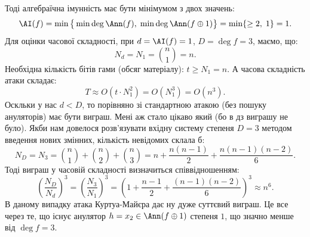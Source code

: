 Тоді алгебраїчна імунність має бути мінімумом з двох значень:
\begin{equation*}
    \AI(f) = \min\big\{\min \deg \Ann(f),\; \min \deg \Ann(f \oplus 1)\big\} = \min\{\geq 2,\; 1\} = 1.
\end{equation*}
Для оцінки часової складності, при $d = \AI(f) = 1$, $D = \deg f = 3$, маємо, що:
\begin{equation*}
    N_{d} = N_{1} = \binom{n}{1} = n.
\end{equation*}
Необхідна кількість бітів гами (обсяг матеріалу): $t \geq N_1 = n$. А часова складність атаки складає:
\begin{equation*}
    T \approx O\!\left(t \cdot N_1^2\right) = O\!\left(N_1^3\right) = O(n^3).
\end{equation*}
Оскльки у нас $d < D$, то порівняно зі стандартною атакою (без пошуку ануляторів) має бути виграш. Мені аж стало 
цікаво який (бо в дз виграшу не було). Якби нам довелося розв'язувати вхідну систему степеня $D = 3$ методом 
введення нових змінних, кількість невідомих склала б:
\begin{equation*}
    N_D = N_3 = \binom{n}{1} + \binom{n}{2} + \binom{n}{3}
    = n + \frac{n(n-1)}{2} + \frac{n(n-1)(n-2)}{6}.
\end{equation*}
Тоді виграш у часовій складності визначиться співвідношенням:
\begin{equation*}
    \left(\frac{N_D}{N_d}\right)^{\!3} = \left(\frac{N_3}{N_1}\right)^{\!3}
    = \left(1 + \frac{n-1}{2} + \frac{(n-1)(n-2)}{6}\right)^{\!3} \approx n^{6}.
\end{equation*}
В даному випадку атака Куртуа-Майєра дає ну дуже суттєвий виграш. Це все через те, що існує анулятор 
$h = x_2 \in \Ann(f \oplus 1)$ степеня $1$, що значно менше від $\deg f = 3$.